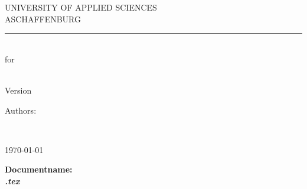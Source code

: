 \documentclass[a4paper]{scrreprt}
\begin{document}
\sffamily

\begin{titlepage}
	\begin{flushleft}
		\begin{LARGE}
			UNIVERSITY OF APPLIED SCIENCES \\ ASCHAFFENBURG
		\end{LARGE}
	\end{flushleft}

	\rule{15cm}{5pt}\vskip1cm

	\begin{flushright}
		\begin{bfseries}
			\begin{Huge}
				\documentname\\
				\vspace{1.4cm}
				for\\
				\vspace{1.4cm}
				\projectname\\
			\end{Huge}

			\vspace{1.2cm}

			\begin{Large}
				Version \docversion \docstatus\\
			\end{Large}
		\end{bfseries}

		\vspace{2.2cm}

		\begin{Large}
			\begin{bfseries}
				Authors: \\
			\end{bfseries}
			\authors\\
		\end{Large}
		
		\vspace{1.5cm}

		\begin{bfseries} 
			\today\\ 
		\end{bfseries}

		\vspace{0.5cm}

		\small \bfseries{Documentname:}\\ \mdseries \textit{\jobname .tex}
	\end{flushright}
\end{titlepage}
\end{document}
